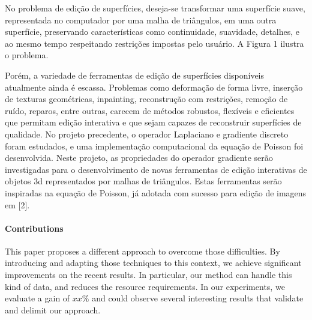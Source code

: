 No problema de edição de superfícies, deseja-se transformar uma superfície suave, representada no 
computador por uma malha de triângulos, em uma outra superfície, preservando características como 
continuidade, suavidade, detalhes, e ao mesmo tempo respeitando restrições impostas pelo usuário. A 
Figura 1 ilustra o problema.

Porém, a variedade de ferramentas de edição de superfícies disponíveis atualmente ainda é escassa. 
Problemas como deformação de forma livre, inserção de texturas geométricas, inpainting, reconstrução 
com restrições, remoção de ruído, reparos, entre outras, carecem de métodos robustos, flexíveis e 
eficientes que permitam edição interativa e que sejam capazes de reconstruir superfícies de qualidade. 
No projeto precedente, o operador Laplaciano e gradiente discreto foram estudados, e uma 
implementação computacional da equação de Poisson foi desenvolvida. Neste projeto, as propriedades do 
operador gradiente serão investigadas para o desenvolvimento de novas ferramentas de edição interativas 
de objetos 3d representados por malhas de triângulos. Estas ferramentas serão inspiradas na equação de 
Poisson, já adotada com sucesso para edição de imagens em [2].


\paragraph*{Contributions}
%
This paper proposes a different approach to overcome those difficulties. By introducing and adapting those techniques to this context, we achieve significant improvements on the recent results. In particular, our method can handle this kind of data, and reduces the resource requirements. In our experiments, we evaluate a gain of $xx\%$ and could observe several interesting results that validate and delimit our approach.


%
%

